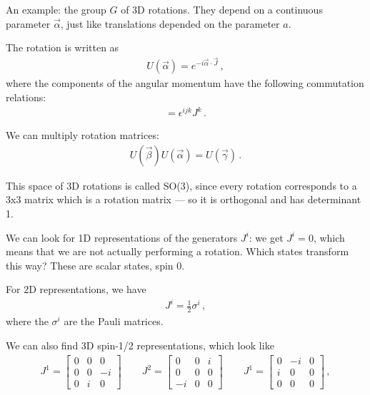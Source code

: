 \documentclass[main.tex]{subfiles}
\begin{document}
An example: the group \(G\) of 3D rotations. 
They depend on a continuous parameter \(\vec{\alpha}\), just like translations depended on the parameter \(a\). 

The rotation is written as 
%
\begin{align}
U(\vec{\alpha}) = e^{-i \vec{\alpha} \cdot \vec{J}}
\,,
\end{align}
%
where the components of the angular momentum have the following commutation relations: 
%
\begin{align}
[J^{i}, J^{j}] = \epsilon^{ijk} J^{k}
\,.
\end{align}

We can multiply rotation matrices: 
%
\begin{align}
U(\vec{\beta}) U(\vec{\alpha}) = U(\vec{\gamma})
\,.
\end{align}

This space of 3D rotations is called SO(3), since every rotation corresponds to a 3x3 matrix which is a rotation matrix --- so it is orthogonal and has determinant 1.

We can look for 1D representations of the generators \(J^{i}\): we get \(J^{i} = 0\), which means that we are not actually performing a rotation.
Which states transform this way? These are scalar states, spin 0. 

For 2D representations, we have 
%
\begin{align}
J^{i} =\frac{1}{2} \sigma^{i} 
\,,
\end{align}
%
where the \(\sigma^{i}\) are the Pauli matrices.

We can also find 3D spin-1/2 representations, which look like 
%
\begin{subequations}
\begin{align}
J^{1}= \left[\begin{array}{ccc}
0 & 0 & 0 \\ 
0 & 0 & -i \\ 
0 & i & 0
\end{array}\right] 
\qquad 
J^{2}= \left[\begin{array}{ccc}
0 & 0 & i \\ 
0 & 0 & 0 \\ 
-i & 0 & 0
\end{array}\right] 
\qquad 
J^{1}= \left[\begin{array}{ccc}
0 & -i & 0 \\ 
i & 0 & 0 \\ 
0 & 0 & 0
\end{array}\right] 
\,,
\end{align}
\end{subequations}
%
\end{document}
